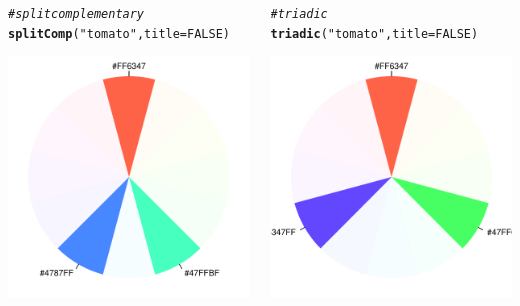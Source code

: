 \documentclass[12pt]{beamer}\usepackage[]{graphicx}\usepackage[]{color}
\makeatletter
\newcommand{\hlnum}[1]{\textcolor[rgb]{0.686,0.059,0.569}{#1}}%
\newcommand{\hlstr}[1]{\textcolor[rgb]{0.192,0.494,0.8}{#1}}%
\newcommand{\hlcom}[1]{\textcolor[rgb]{0.678,0.584,0.686}{\textit{#1}}}%
\newcommand{\hlstd}[1]{\textcolor[rgb]{0.345,0.345,0.345}{#1}}%
\newcommand{\hlkwc}[1]{\textcolor[rgb]{0.333,0.667,0.333}{#1}}%
\newcommand{\hlkwd}[1]{\textcolor[rgb]{0.737,0.353,0.396}{\textbf{#1}}}%
\newenvironment{kframe}{%
 \def\at@end@of@kframe{}%
 \ifinner\ifhmode%
  \def\at@end@of@kframe{\end{minipage}}%
  \begin{minipage}{\columnwidth}%
 \fi\fi%
 \def\FrameCommand##1{\hskip\@totalleftmargin \hskip-\fboxsep
 \colorbox{shadecolor}{##1}\hskip-\fboxsep
     \hskip-\linewidth \hskip-\@totalleftmargin \hskip\columnwidth}%
 \MakeFramed {\advance\hsize-\width
   \@totalleftmargin\z@ \linewidth\hsize
   \@setminipage}}%
 {\par\unskip\endMakeFramed%
 \at@end@of@kframe}
\newenvironment{knitrout}{}{} %
\makeatother
\begin{document}
\begin{frame}[fragile]

\begin{columns}[t]
\begin{column}{0.5\textwidth}
\begin{knitrout}\tiny
{}\color{fgcolor}\begin{kframe}
\begin{alltt}
\hlcom{# split complementary}
\hlkwd{splitComp}\hlstd{(}\hlstr{"tomato"}\hlstd{,} \hlkwc{title} \hlstd{=} \hlnum{FALSE}\hlstd{)}
\end{alltt}
\end{kframe}

{\centering \includegraphics[width=.6\linewidth,height=.6\linewidth]{figure/tomato_split-1} 

}



\end{knitrout}
\end{column}

\begin{column}{0.5\textwidth}
\begin{knitrout}\tiny
{}\color{fgcolor}\begin{kframe}
\begin{alltt}
\hlcom{# triadic}
\hlkwd{triadic}\hlstd{(}\hlstr{"tomato"}\hlstd{,} \hlkwc{title} \hlstd{=} \hlnum{FALSE}\hlstd{)}
\end{alltt}
\end{kframe}

{\centering \includegraphics[width=.6\linewidth,height=.6\linewidth]{figure/tomato_triadic-1} 

}
\end{knitrout}
\end{column}
\end{columns}
\end{frame}
\end{document}
